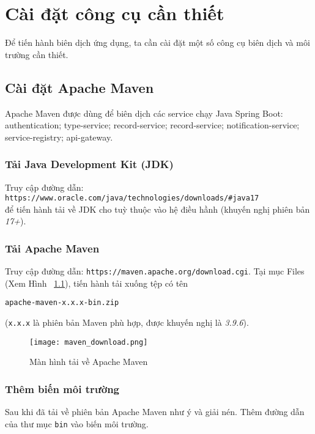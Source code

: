 \chapter{Cài đặt công cụ cần thiết}
\label{Chapter1}

Để tiến hành biên dịch ứng dụng, ta cần cài đặt một số công cụ biên dịch và môi trường cần thiết.
\section{Cài đặt Apache Maven}
Apache Maven được dùng để biên dịch các service chạy Java Spring Boot: authentication; type-service; record-service; record-service; notification-service; service-registry; api-gateway.
    \subsection{Tải Java Development Kit (JDK)}
        Truy cập đường dẫn: \\
        \texttt{https://www.oracle.com/java/technologies/downloads/\#java17} \\
        
        để tiến hành tải về JDK cho tuỳ thuộc vào hệ điều hầnh (khuyến nghị phiên bản \textit{17+}).
    \subsection{Tải Apache Maven}
        Truy cập đường dẫn: \texttt{https://maven.apache.org/download.cgi}.
        Tại mục Files (Xem Hình ~\ref{fig:maven_download}), tiến hành tải xuống tệp có tên 
        
        \texttt{apache-maven-x.x.x-bin.zip} 
        
        (\texttt{x.x.x} là phiên bản Maven phù hợp, được khuyến nghị là \textit{3.9.6}).

        \begin{figure}
            \begin{center}
                \texttt{[image: maven\_download.png]}
                \caption{Màn hình tải về Apache Maven}
                \label{fig:maven_download}
            \end{center}
        \end{figure} 
    \subsection{Thêm biến môi trường}
        Sau khi đã tải về phiên bản Apache Maven như ý và giải nén. Thêm đường dẫn của thư mục \texttt{bin} vào biến môi trường.

